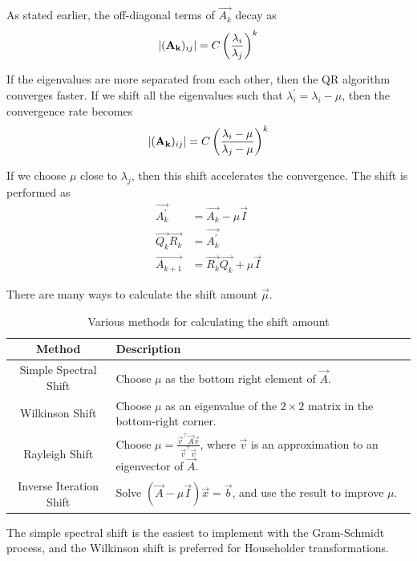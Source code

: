 \documentclass{article}
\begin{document}
As stated earlier, the off-diagonal terms of $\vec{A_k}$ decay as
\begin{align}
    \left\vert(\mathbf{A_k})_{ij}\right\vert = C \left(\frac{\lambda_i}{\lambda_j}\right)^k
\end{align}

If the eigenvalues are more separated from each other, then the QR algorithm converges
faster. 
If we shift all the eigenvalues such that $\lambda_i^\prime = \lambda_i - \mu$,
then the convergence rate becomes
\begin{align}
    \left\vert(\mathbf{A_k})_{ij}\right\vert = C \left(\frac{\lambda_i - \mu}{\lambda_j - \mu}\right)^k
\end{align}

If we choose $\mu$ close to $\lambda_j$, then this shift accelerates the convergence.
The shift is performed as
\begin{align}
    \vec{A_k^\prime} &= \vec{A_k} - \mu\vec{I} \\
    \vec{Q_k}\vec{R_k} &= \vec{A_k^\prime} \\
    \vec{A_{k+1}} &= \vec{R_k}\vec{Q_k} + \mu\vec{I}
\end{align}

There are many ways to calculate the shift amount $\vec{\mu}$.

\begin{table}[h!]
\centering
\begin{tabular}{|c|p{5cm}|}    
    \hline
    \textbf{Method} & \textbf{Description} \\
    \hline
    Simple Spectral Shift & Choose $\mu$ as the bottom right element of $\vec{A}$. \\
    \hline
    Wilkinson Shift & Choose $\mu$ as an eigenvalue of the $2 \times 2$ matrix in the bottom-right corner. \\
    \hline
    Rayleigh Shift & Choose $\mu = \frac{\vec{v}^\top\vec{A}\vec{v}}{\vec{v}^\top\vec{v}}$, where $\vec{v}$ is an approximation to an eigenvector of $\vec{A}$. \\
    \hline
    Inverse Iteration Shift & Solve $(\vec{A} - \mu\vec{I})\vec{x} = \vec{b}$, and use the result to improve $\mu$. \\
    \hline
\end{tabular}
\caption{Various methods for calculating the shift amount}
\end{table}

The simple spectral shift is the easiest to implement with the Gram-Schmidt process,
and the Wilkinson shift is preferred for Householder transformations.
\end{document}
